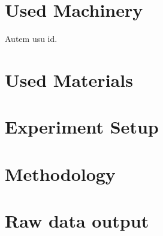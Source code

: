 {}

\section*{Used Machinery}


\begin{table}[h]
    \caption[Autem usu id]{Autem usu id.}
    \label{tab:moreexample}
\end{table}


\section*{Used Materials}


\section*{Experiment Setup}


\section*{Methodology}

\section*{Raw data output}


